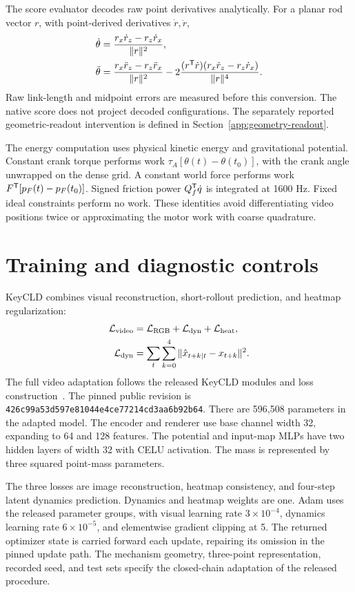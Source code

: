 \documentclass[10pt,twocolumn,letterpaper]{article}
\begin{document}
The score evaluator decodes raw point derivatives analytically. For a planar rod vector $r$, with point-derived derivatives $\dot r,\ddot r$,
\begin{align}
\dot\theta&=\frac{r_x\dot r_z-r_z\dot r_x}{\|r\|^2},\\
\ddot\theta&=\frac{r_x\ddot r_z-r_z\ddot r_x}{\|r\|^2}
-2\frac{(r^{\mathsf T}\dot r)(r_x\dot r_z-r_z\dot r_x)}{\|r\|^4}.
\end{align}
Raw link-length and midpoint errors are measured before this conversion. The native score does not project decoded configurations. The separately reported geometric-readout intervention is defined in Section~\ref{app:geometry-readout}.

The energy computation uses physical kinetic energy and gravitational potential. Constant crank torque performs work $\tau_A[\theta(t)-\theta(t_0)]$, with the crank angle unwrapped on the dense grid. A constant world force performs work $F^{\mathsf T}[p_F(t)-p_F(t_0)]$. Signed friction power $Q_f^{\mathsf T}\dot q$ is integrated at 1600 Hz. Fixed ideal constraints perform no work. These identities avoid differentiating video positions twice or approximating the motor work with coarse quadrature.

\section{Training and diagnostic controls}
KeyCLD combines visual reconstruction, short-rollout prediction, and heatmap regularization:
\begin{equation}
\begin{aligned}
\mathcal L_{\rm video}&=\mathcal L_{\rm RGB}+\mathcal L_{\rm dyn}+\mathcal L_{\rm heat},\\
\mathcal L_{\rm dyn}&=\sum_t\sum_{k=0}^{4}\|\hat x_{t+k\mid t}-x_{t+k}\|^2.
\end{aligned}
\label{eq:learning}
\end{equation}
\label{app:training}
The full video adaptation follows the released KeyCLD modules and loss construction~\cite{daems2024keycld}. The pinned public revision is
\texttt{426c99a53d597e81044e4ce77214cd3aa6b92b64}.
There are 596,508 parameters in the adapted model. The encoder and renderer use base channel width 32, expanding to 64 and 128 features. The potential and input-map MLPs have two hidden layers of width 32 with CELU activation. The mass is represented by three squared point-mass parameters.

The three losses are image reconstruction, heatmap consistency, and four-step latent dynamics prediction. Dynamics and heatmap weights are one. Adam uses the released parameter groups, with visual learning rate $3\times10^{-4}$, dynamics learning rate $6\times10^{-5}$, and elementwise gradient clipping at 5. The returned optimizer state is carried forward each update, repairing its omission in the pinned update path. The mechanism geometry, three-point representation, recorded seed, and test sets specify the closed-chain adaptation of the released procedure.
\end{document}
